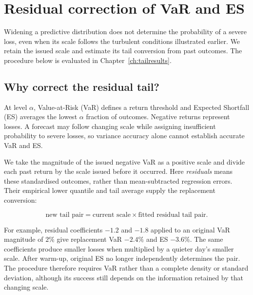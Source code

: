 \chapter{Residual correction of VaR and ES}
\label{ch:recalibration}

Widening a predictive distribution does not determine the probability of a severe loss, even when its scale follows the turbulent conditions illustrated earlier. We retain the issued scale and estimate its tail conversion from past outcomes. The procedure below is evaluated in Chapter~\ref{ch:tailresults}.

\section{Why correct the residual tail?}

At level $\alpha$, Value-at-Risk (VaR) defines a return threshold and Expected Shortfall (ES) averages the lowest $\alpha$ fraction of outcomes. Negative returns represent losses. A forecast may follow changing scale while assigning insufficient probability to severe losses, so variance accuracy alone cannot establish accurate VaR and ES.

We take the magnitude of the issued negative VaR as a positive scale and divide each past return by the scale issued before it occurred. Here \emph{residuals} means these standardised outcomes, rather than mean-subtracted regression errors. Their empirical lower quantile and tail average supply the replacement conversion:

\begin{equation}
  \text{new tail pair}=\text{current scale}\times\text{fitted residual tail pair}.
  \label{eq:recal-workflow}
\end{equation}

For example, residual coefficients $-1.2$ and $-1.8$ applied to an original VaR magnitude of $2\%$ give replacement VaR $-2.4\%$ and ES $-3.6\%$. The same coefficients produce smaller losses when multiplied by a quieter day's smaller scale. After warm-up, original ES no longer independently determines the pair. The procedure therefore requires VaR rather than a complete density or standard deviation, although its success still depends on the information retained by that changing scale.

